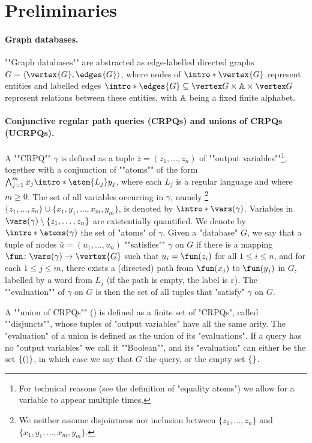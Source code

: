 \section{Preliminaries}
\label{sec-prelims}

\paragraph{Graph databases.}
\AP ""Graph databases"" are abstracted as edge-labelled directed graphs
$G = \langle \vertex{G}, \edges{G} \rangle$, 
where nodes of $\intro*\vertex{G}$ represent entities and labelled edges $\intro*\edges{G} \subseteq \vertex G \times \A \times \vertex G$
represent relations between these entities, with $\mathbb{A}$ being a fixed finite alphabet.

\paragraph{Conjunctive regular path queries (CRPQs) and unions of CRPQs (UCRPQs).}
\AP A ""CRPQ"" $\gamma$ is defined as a tuple $\bar z = (z_1,\hdots,z_n)$
of ""output variables""\footnote{For technical reasons (see the definition of "equality atoms") we allow for a variable to appear multiple times.},
together with a conjunction of ""atoms"" of the form
\AP$\bigwedge_{j=1}^m x_j \intro*\atom{L_j} y_j$, where each $L_j$ is a regular language
and where $m \geq 0$.
The set of all variables occurring in $\gamma$, namely%
\footnote{We neither assume 
disjointness nor inclusion between $\{z_1,\hdots,z_n\}$ and $\{x_1,y_1,\hdots,x_m,y_m\}$.}
$\{z_1,\hdots,z_n\}\cup\{x_1,y_1,\hdots,x_m,y_m\}$, is denoted by
$\intro*\vars(\gamma)$. Variables in $\vars(\gamma)\setminus \{z_1,\hdots,z_n\}$ are existentially quantified. 
We denote by $\intro*\atoms(\gamma)$ the set of "atoms" of $\gamma$.
Given a "database" $G$, we say that a tuple of nodes $\bar u = (u_1,\hdots,u_n)$
\AP""satisfies"" $\gamma$ 
on $G$ if there is a mapping
$\fun\colon \vars(\gamma) \to \vertex{G}$ such that $u_i = \fun(z_i)$ for all
$1 \leq i \leq n$, and for each $1 \leq j \leq m$,
there exists a (directed) path from $\fun(x_j)$ to $\fun(y_j)$ in $G$, labelled by
a word from $L_j$ (if the path is empty, the label is $\varepsilon$). The \AP""evaluation"" of $\gamma$ on $G$ is then the set of all tuples that "satisfy" $\gamma$ on $G$.

A ""union of CRPQs"" ()
is defined as a finite set of "CRPQs", called \AP""disjuncts"", whose tuples of "output variables" have all the same arity.
The "evaluation" of a union is defined as the union of its "evaluations". 
If a query has no "output variables" we call it ""Boolean"", and
its "evaluation" can either be the set $\{()\}$, in which case we say that $G$
 the query, or the empty set $\{\}$.

